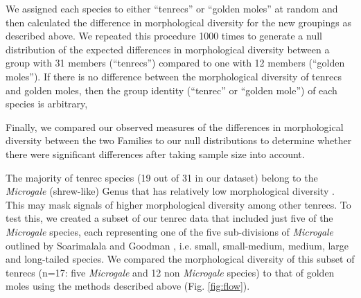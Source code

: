 \documentclass[12pt,a4paper]{article}
\begin{document}
	We assigned each species to either ``tenrecs'' or ``golden moles'' at random and then calculated the difference in morphological diversity for the new groupings as described above. We repeated this procedure 1000 times to generate a null distribution of the expected differences in morphological diversity between a group with 31 members (``tenrecs'') compared to one with 12 members (``golden moles''). If there is no difference between the morphological diversity of tenrecs and golden moles, then the group identity (``tenrec'' or ``golden mole'') of each species is arbitrary, %

	Finally, we compared our observed measures of the differences in morphological diversity between the two Families to our null distributions to determine whether there were significant differences after taking sample size into account.

	
	The majority of tenrec species (19 out of 31 in our dataset) belong to the \textit{Microgale} (shrew-like) Genus that has relatively low morphological diversity \citep{Soarimalala2011, Jenkins2003}. This may mask signals of higher morphological diversity among other tenrecs. 
	To test this, we created a subset of our tenrec data that included just five of the \textit{Microgale} species, each representing one of the five sub-divisions of \textit{Microgale} outlined by Soarimalala and Goodman \citeyearpar{Soarimalala2011}, i.e. small, small-medium, medium, large and long-tailed species. We compared the morphological diversity of this subset of tenrecs (n=17: five \textit{Microgale} and 12 non \textit{Microgale} species) to that of golden moles using the methods described above (Fig. \ref{fig:flow}).
	 

\end{document}

